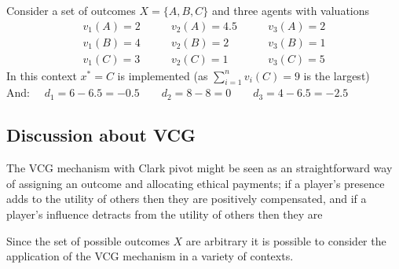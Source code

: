 \begin{example}
Consider a set of outcomes $X = \{A,B,C\}$ and three agents with valuations 
$$\begin{matrix}v_1(A) = 2\\v_1(B) = 4\\v_1(C) = 3\end{matrix}\quad\quad
\begin{matrix}v_2(A) = 4.5\\v_2(B) = 2\\v_2(C) = 1\end{matrix}\quad\quad
\begin{matrix}v_3(A) = 2\\v_3(B) = 1\\v_3(C) = 5\end{matrix}$$
In this context $x^* = C$ is implemented (as $\sum_{i=1}^nv_i(C)=9$ is the largest)\\And:
$\quad d_1 = 6-6.5 = -0.5 \quad\quad d_2 = 8-8 = 0\quad\quad d_3 = 4-6.5 = -2.5 $
\end{example}

\subsection{Discussion about VCG}
The VCG mechanism with Clark pivot might be seen as an straightforward way of assigning an outcome and allocating ethical payments; if a player's presence adds to the utility of others then they are positively compensated, and if a player's influence detracts from the utility of others then they are \DIFdelbegin {}%

\DIFdelend \DIFaddbegin {}\DIFaddend Since the set of possible outcomes $X$ are arbitrary it is possible to consider the application of the VCG mechanism in a \DIFaddbegin {}\DIFaddend variety of contexts.
\DIFdelbegin {}%


